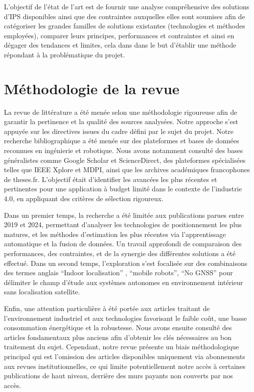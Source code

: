\documentclass[11pt, a4paper]{article}
\begin{document}
L’objectif de l’état de l’art est de fournir une analyse compréhensive des solutions d’IPS disponibles ainsi que des contraintes auxquelles elles sont soumises afin de catégoriser les grandes familles de solutions existantes (technologies et méthodes employées), comparer leurs principes, performances et contraintes et ainsi en dégager des tendances et limites, cela dans dans le but d’établir une méthode répondant à la problématique du projet.

\section{Méthodologie de la revue}

La revue de littérature a été menée selon une méthodologie rigoureuse afin de garantir la pertinence et la qualité des sources analysées. Notre approche s'est appuyée sur les directives issues du cadre défini par le sujet du projet. Notre recherche bibliographique a été menée sur des plateformes et bases de données reconnues en ingénierie et robotique. Nous avons notamment consulté des bases généralistes comme Google Scholar et ScienceDirect, des plateformes spécialisées telles que IEEE Xplore et MDPI, ainsi que les archives académiques francophones de theses.fr. L'objectif était d'identifier les avancées les plus récentes et pertinentes pour une application à budget limité dans le contexte de l'industrie 4.0, en appliquant des critères de sélection rigoureux. 

Dans un premier temps, la recherche a été limitée aux publications parues entre 2019 et 2024, permettant d’analyser les technologies de positionnement les plus matures, et les méthodes d'estimation les plus récentes via l’apprentissage automatique et la fusion de données. Un travail approfondi de comparaison des performances, des contraintes, et de la synergie des différentes solutions a été effectué. Dans un second temps, l’exploration s’est focalisée sur des combinaisons des termes anglais “Indoor localisation” , “mobile robots”, “No GNSS” pour délimiter le champ d’étude aux systèmes autonomes en environnement intérieur sans localisation satellite.

Enfin, une attention particulière à été portée aux articles traitant de l’environnement industriel et aux technologies favorisant le faible coût, une basse consommation énergétique et la robustesse. Nous avons ensuite consulté des articles fondamentaux plus anciens afin d’obtenir les clés nécessaires au bon traitement du sujet. Cependant, notre revue présente un biais méthodologique principal qui est l’omission des articles disponibles uniquement via abonnements aux revues institutionnelles, ce qui limite potentiellement notre accès à certaines publications de haut niveau, derrière des murs payants non couverts par nos accès.  
\end{document}

